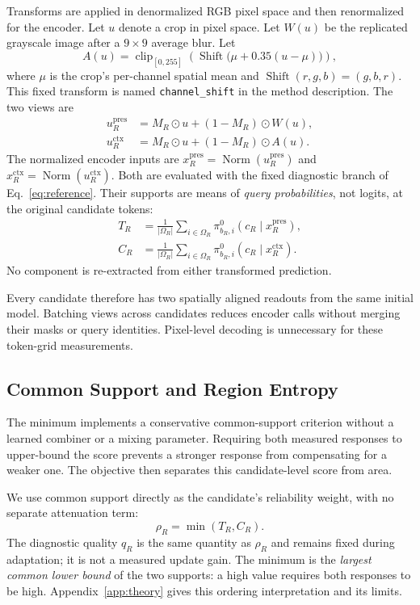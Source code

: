 \documentclass[letterpaper]{article}
\begin{document}
Transforms are applied in denormalized RGB pixel space and then renormalized for the encoder. Let $u$ denote a crop in pixel space. Let $W(u)$ be the replicated grayscale image after a $9\times9$ average blur. Let
\begin{equation}
A(u)=\operatorname{clip}_{[0,255]}
\left(\operatorname{Shift}\bigl(\mu+0.35(u-\mu)\bigr)\right),
\end{equation}
where $\mu$ is the crop's per-channel spatial mean and $\operatorname{Shift}(r,g,b)=(g,b,r)$. This fixed transform is named \texttt{channel\_shift} in the method description. The two views are
\begin{align}
u_R^{\mathrm{pres}}&=M_R\odot u+(1-M_R)\odot W(u),\\
u_R^{\mathrm{ctx}}&=M_R\odot u+(1-M_R)\odot A(u).
\end{align}
The normalized encoder inputs are $x_R^{\mathrm{pres}}=\operatorname{Norm}(u_R^{\mathrm{pres}})$ and $x_R^{\mathrm{ctx}}=\operatorname{Norm}(u_R^{\mathrm{ctx}})$. Both are evaluated with the fixed diagnostic branch of Eq.~\ref{eq:reference}. Their supports are means of \emph{query probabilities}, not logits, at the original candidate tokens:
\begin{align}
T_R&=\frac{1}{|\Omega_R|}\sum_{i\in\Omega_R}
\pi^0_{b_R,i}(c_R\mid x_R^{\mathrm{pres}}),\\
C_R&=\frac{1}{|\Omega_R|}\sum_{i\in\Omega_R}
\pi^0_{b_R,i}(c_R\mid x_R^{\mathrm{ctx}}).
\end{align}
No component is re-extracted from either transformed prediction.

Every candidate therefore has two spatially aligned readouts from the same initial model. Batching views across candidates reduces encoder calls without merging their masks or query identities. Pixel-level decoding is unnecessary for these token-grid measurements.

\subsection{Common Support and Region Entropy}
The minimum implements a conservative common-support criterion without a learned combiner or a mixing parameter. Requiring both measured responses to upper-bound the score prevents a stronger response from compensating for a weaker one. The objective then separates this candidate-level score from area.

We use common support directly as the candidate's reliability weight, with no separate attenuation term:
\begin{equation}
\rho_R=\min(T_R,C_R).
\label{eq:minimum}
\end{equation}
The diagnostic quality $q_R$ is the same quantity as $\rho_R$ and remains fixed during adaptation; it is not a measured update gain. The minimum is the \emph{largest common lower bound} of the two supports: a high value requires both responses to be high. Appendix~\ref{app:theory} gives this ordering interpretation and its limits.
\end{document}
